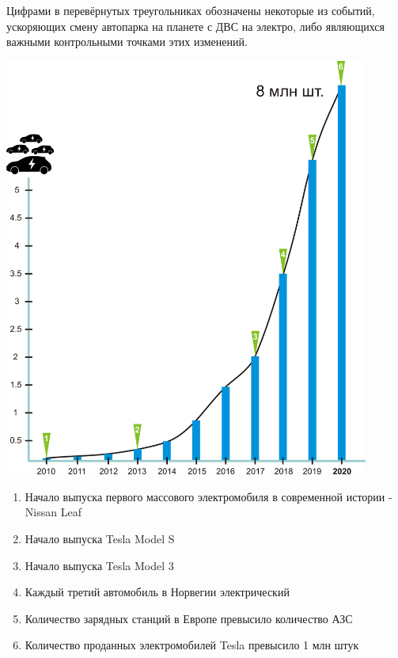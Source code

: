 \documentclass[a4paper,12pt]{report}
\begin{document}
Цифрами в перевёрнутых треугольниках обозначены некоторые из событий, ускоряющих смену автопарка на планете с ДВС на электро, либо являющихся важными контрольными точками этих изменений.

\vspace*{1cm}
\includegraphics[width=12cm]{chart1}
\vspace*{1cm}

\begin{enumerate}
	\item Начало выпуска первого массового электромобиля в современной истории - Nissan Leaf
	\item Начало выпуска Tesla Model S
	\item Начало выпуска Tesla Model 3
	\item Каждый третий автомобиль в Норвегии электрический
	\item Количество зарядных станций в Европе превысило количество АЗС
	\item Количество проданных электромобилей Tesla превысило 1 млн штук
\end{enumerate}
\end{document}
